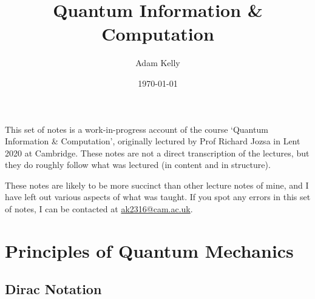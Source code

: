 \documentclass[a4paper]{article}
\title{Quantum Information \& Computation}
\author{Adam Kelly}
\date{\today}
\begin{document}
\maketitle

	This set of notes is a work-in-progress account of the course `Quantum Information \& Computation', originally lectured by Prof Richard Jozsa in Lent 2020 at Cambridge. These notes are not a direct transcription of the lectures, but they do roughly follow what was lectured (in content and in structure).

	These notes are likely to be more succinct than other lecture notes of mine, and I have left out various aspects of what was taught. If you spot any errors in this set of notes, I can be contacted at \href{mailto:ak2316@cam.ac.uk}{ak2316@cam.ac.uk}.







\tableofcontents

\section{Principles of Quantum Mechanics}


\subsection{Dirac Notation}
\end{document}
